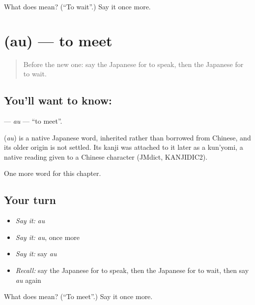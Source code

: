 \begin{tcolorbox}[breakable,colback=teal!4,colframe=teal!35!black,title={Before you move on}]
What does  mean? (\textquotedblleft{}To wait\textquotedblright{}.) Say it once more.
\end{tcolorbox}
\section[\texorpdfstring{\ja{あう} (au)}{あう (au)}]{ (au) — to meet}

\label{lesson:JA-C27-au}



\begin{quote}
Before the new one: say the Japanese for to speak, then the Japanese for to wait.
\end{quote}

\subsection*{You'll want to know: }
\textbf{} — \emph{au} — \textquotedblleft{}to meet\textquotedblright{}.

\begin{cousinweb}
\textbf{} (\emph{au}) is a native Japanese word, inherited rather than borrowed from Chinese, and its older origin is not settled. Its kanji was attached to it later as a kun'yomi, a native reading given to a Chinese character (JMdict, KANJIDIC2).
\end{cousinweb}

\begin{grammarlens}[title={What you've built}]
One more word for this chapter.
\end{grammarlens}

\subsection*{Your turn}
\begin{itemize}
\raggedright
  \item \emph{Say it:} \emph{au}
  \item \emph{Say it:} \emph{au}, once more
  \item \emph{Say it:} say \emph{au}
  \item \emph{Recall:} say the Japanese for to speak, then the Japanese for to wait, then say \emph{au} again
\end{itemize}

\begin{tcolorbox}[breakable,colback=teal!4,colframe=teal!35!black,title={Before you move on}]
What does  mean? (\textquotedblleft{}To meet\textquotedblright{}.) Say it once more.
\end{tcolorbox}
